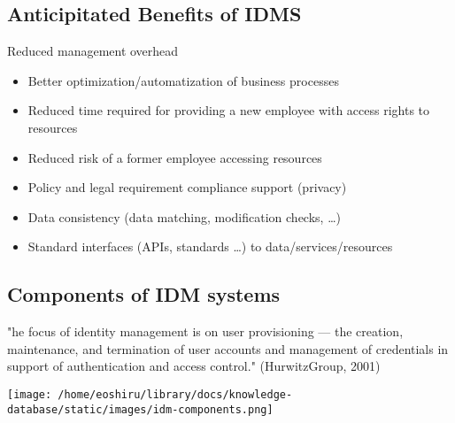\documentclass[11pt]{article}
\begin{document}
\subsection{Anticipitated Benefits of IDMS}
\label{sec:org757ba79}
Reduced management overhead
\begin{itemize}
\item Better optimization/automatization of business processes
\item Reduced time required for providing a new employee with access rights to resources
\item Reduced risk of a former employee accessing resources
\item Policy and legal requirement compliance support (privacy)
\item Data consistency (data matching, modification checks, …)
\item Standard interfaces (APIs, standards …) to data/services/resources
\end{itemize}

\subsection{Components of IDM systems}
\label{sec:orgf6a8fc6}
"he focus of identity management is on user provisioning — the creation, maintenance, and termination of user accounts and management of credentials in support of authentication and access control." (HurwitzGroup, 2001)\\
\begin{center}
\texttt{[image: /home/eoshiru/library/docs/knowledge-database/static/images/idm-components.png]}
\end{center}
\end{document}
